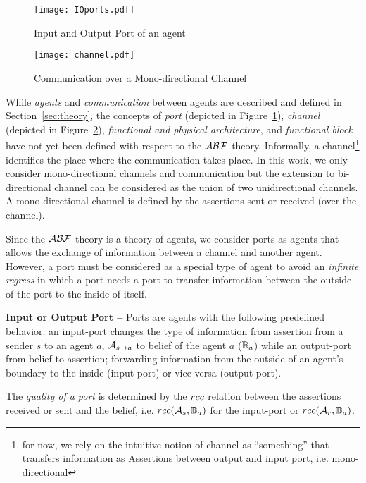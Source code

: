 \begin{figure}[t]
	\centering
	\texttt{[image: IOports.pdf]}
	\caption{Input and Output Port of an agent}
	\label{fig:ioports}
\end{figure}

\begin{figure}[t]
	\centering
	\texttt{[image: channel.pdf]}
	\caption{Communication over a Mono-directional Channel}
	\label{fig:channel}
\end{figure}

While \emph{agents} and \emph{communication} between agents are described and
defined in Section~\ref{sec:theory}, the concepts of \emph{port} (depicted in
Figure~\ref{fig:ioports}), \emph{channel} (depicted in
Figure~\ref{fig:channel}), \emph{functional and physical architecture}, and
\emph{functional block} have not yet been defined with respect to the
$\mathcal{A}\mathcal{B}\mathcal{F}$-theory.  Informally, a channel\footnote{for now, we rely on the
intuitive notion of channel as ``something'' that transfers information as
Assertions between output and input port, i.e. mono-directional} identifies the
place where the communication takes place.  In this work, we only consider
mono-directional channels and communication but the extension to bi-directional
channel can be considered as the union of two unidirectional channels. A
mono-directional channel is defined by the assertions sent or received (over
the channel). 

Since the $\mathcal{A}\mathcal{B}\mathcal{F}$-theory is a theory of agents, we consider ports as agents that
allows the exchange of information between a channel and another
agent.  However, a port must be considered as a special type of agent to avoid
an \emph{infinite regress} in which a port needs a port to transfer information
between the outside of the port to the inside of itself.

\begin{definition}{\bf Input or Output Port --}\label{def:port} 
	Ports are agents with the following predefined behavior: an input-port changes
	the type of information from assertion from a sender $s$ to an agent $a$,
	$\rassert{s}{a}$ to belief of the agent $a$ ($\mathbb{B}_a$) while an
	output-port from belief to assertion; forwarding information from the outside
	of an agent's boundary to the inside (input-port) or vice versa (output-port). 
\end{definition}
The \emph{quality of a port} is determined by the $rcc$ relation between the 
assertions received or sent and the belief, i.e. $rcc(\mathcal{A}_s,\mathbb{B}_a)$ for the input-port
or $rcc(\mathcal{A}_r,\mathbb{B}_a)$.

